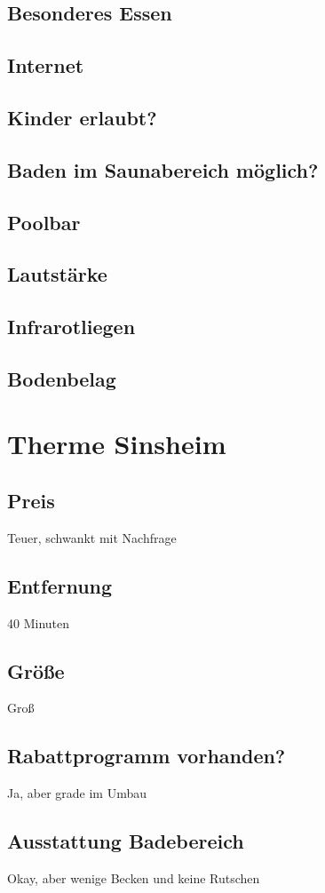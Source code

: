 \documentclass{article}
\begin{document}
\subsection*{Besonderes Essen}
\subsection*{Internet}
\subsection*{Kinder erlaubt?}
\subsection*{Baden im Saunabereich möglich?}
\subsection*{Poolbar}
\subsection*{Lautstärke}
\subsection*{Infrarotliegen}
\subsection*{Bodenbelag}
\pagebreak

\section*{Therme Sinsheim}
\subsection*{Preis} Teuer, schwankt mit Nachfrage
\subsection*{Entfernung} 40 Minuten
\subsection*{Größe} Groß
\subsection*{Rabattprogramm vorhanden?} Ja, aber grade im Umbau 
\subsection*{Ausstattung Badebereich} Okay, aber wenige Becken und keine Rutschen
\end{document}
